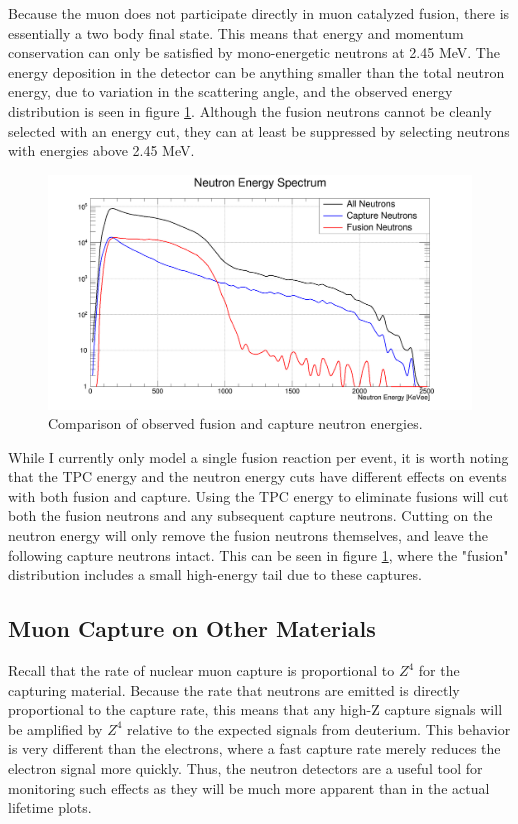 Because the muon does not participate directly in muon catalyzed fusion, there is essentially a two body final state.
This means that energy and momentum conservation can only be satisfied by mono-energetic neutrons at 2.45 MeV. 
The energy deposition in the detector can be anything smaller than the total neutron energy, due to variation in the scattering angle, and the observed energy distribution is seen in figure \ref{fig:fusion_energy}.
Although the fusion neutrons cannot be cleanly selected with an energy cut, they can at least be suppressed by selecting neutrons with energies above 2.45 MeV. 

\begin{figure}[h]
  \includegraphics[width=\textwidth]{neutrons/figures/NeutronEnergy.png}
  \caption{Comparison of observed fusion and capture neutron energies.}
  \label{fig:fusion_energy}
\end{figure}

While I currently only model a single fusion reaction per event, it is worth noting that the TPC energy and the neutron energy cuts have different effects on events with both fusion and capture.
Using the TPC energy to eliminate fusions will cut both the fusion neutrons and any subsequent capture neutrons.  
Cutting on the neutron energy will only remove the fusion neutrons themselves, and leave the following capture neutrons intact.
This can be seen in figure \ref{fig:fusion_energy}, where the "fusion" distribution includes a small high-energy tail due to these captures.

\subsection{Muon Capture on Other Materials}

Recall that the rate of nuclear muon capture is proportional to $Z^4$ for the capturing material. 
Because the rate that neutrons are emitted is directly proportional to the capture rate, this means that any high-Z capture signals will be amplified by $Z^4$ relative to the expected signals from deuterium.
This behavior is very different than the electrons, where a fast capture rate merely reduces the electron signal more quickly.
Thus, the neutron detectors are a useful tool for monitoring such effects as they will be much more apparent than in the actual lifetime plots.

